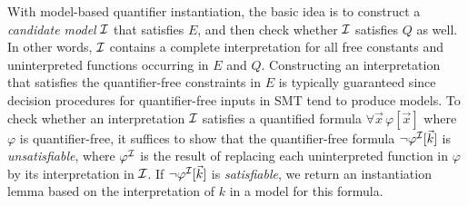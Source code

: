 \documentclass[oribibl]{llncs}
\begin{document}
With model-based quantifier instantiation, the basic idea is
to construct a \emph{candidate model} $\mathcal{I}$ that satisfies $E$, 
and then check whether $\mathcal{I}$ satisfies $Q$ as well.
In other words, $\mathcal{I}$ contains a complete interpretation for all free constants and uninterpreted functions occurring in $E$ and $Q$.
Constructing an interpretation that satisfies the quantifier-free constraints in $E$
is typically guaranteed since decision procedures for quantifier-free inputs in SMT tend to produce models.
To check whether an interpretation $\mathcal{I}$ satisfies a quantified formula $\forall \vec x\, \varphi[ \vec x ]$ where $\varphi$ is quantifier-free,
it suffices to show that the quantifier-free formula $\neg \varphi^{\mathcal{I}}[ \vec k ]$ is \emph{unsatisfiable},
where $\varphi^{\mathcal{I}}$ is the result of replacing each uninterpreted function in $\varphi$
by its interpretation in $\mathcal{I}$.
If $\neg \varphi^{\mathcal{I}}[ \vec k ]$ is \emph{satisfiable}, we return an instantiation lemma based on the interpretation of $k$ in a model
for this formula.
\end{document}
